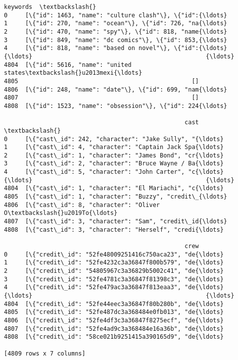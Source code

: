 \documentclass[11pt]{article}
\begin{document}
\begin{tcolorbox}[breakable, size=fbox, boxrule=.5pt, pad at break*=1mm, opacityfill=0]
\begin{Verbatim}[commandchars=\\\{\}]
                                               keywords  \textbackslash{}
0     [\{"id": 1463, "name": "culture clash"\}, \{"id":{\ldots}
1     [\{"id": 270, "name": "ocean"\}, \{"id": 726, "na{\ldots}
2     [\{"id": 470, "name": "spy"\}, \{"id": 818, "name{\ldots}
3     [\{"id": 849, "name": "dc comics"\}, \{"id": 853,{\ldots}
4     [\{"id": 818, "name": "based on novel"\}, \{"id":{\ldots}
{\ldots}                                                 {\ldots}
4804  [\{"id": 5616, "name": "united states\textbackslash{}u2013mexi{\ldots}
4805                                                 []
4806  [\{"id": 248, "name": "date"\}, \{"id": 699, "nam{\ldots}
4807                                                 []
4808  [\{"id": 1523, "name": "obsession"\}, \{"id": 224{\ldots}

                                                   cast  \textbackslash{}
0     [\{"cast\_id": 242, "character": "Jake Sully", "{\ldots}
1     [\{"cast\_id": 4, "character": "Captain Jack Spa{\ldots}
2     [\{"cast\_id": 1, "character": "James Bond", "cr{\ldots}
3     [\{"cast\_id": 2, "character": "Bruce Wayne / Ba{\ldots}
4     [\{"cast\_id": 5, "character": "John Carter", "c{\ldots}
{\ldots}                                                 {\ldots}
4804  [\{"cast\_id": 1, "character": "El Mariachi", "c{\ldots}
4805  [\{"cast\_id": 1, "character": "Buzzy", "credit\_{\ldots}
4806  [\{"cast\_id": 8, "character": "Oliver O\textbackslash{}u2019To{\ldots}
4807  [\{"cast\_id": 3, "character": "Sam", "credit\_id{\ldots}
4808  [\{"cast\_id": 3, "character": "Herself", "credi{\ldots}

                                                   crew
0     [\{"credit\_id": "52fe48009251416c750aca23", "de{\ldots}
1     [\{"credit\_id": "52fe4232c3a36847f800b579", "de{\ldots}
2     [\{"credit\_id": "54805967c3a36829b5002c41", "de{\ldots}
3     [\{"credit\_id": "52fe4781c3a36847f81398c3", "de{\ldots}
4     [\{"credit\_id": "52fe479ac3a36847f813eaa3", "de{\ldots}
{\ldots}                                                 {\ldots}
4804  [\{"credit\_id": "52fe44eec3a36847f80b280b", "de{\ldots}
4805  [\{"credit\_id": "52fe487dc3a368484e0fb013", "de{\ldots}
4806  [\{"credit\_id": "52fe4df3c3a36847f8275ecf", "de{\ldots}
4807  [\{"credit\_id": "52fe4ad9c3a368484e16a36b", "de{\ldots}
4808  [\{"credit\_id": "58ce021b9251415a390165d9", "de{\ldots}

[4809 rows x 7 columns]
\end{Verbatim}
\end{tcolorbox}
        
\end{document}
